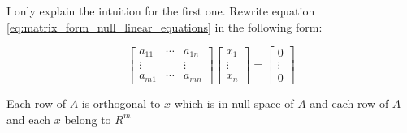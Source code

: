 \documentclass[a4paper]{book}
\newenvironment{proof}[1][Proof]{\begin{trivlist}
\item[\hskip \labelsep {\bfseries #1}]}{\end{trivlist}}
\begin{document}
    \begin{proof}
      I only explain the intuition for the first one. Rewrite equation
      \ref{eq:matrix_form_null_linear_equations} in the following form:

      \begin{displaymath}
        \begin{bmatrix}
          a_{11} & \cdots & a_{1n} \\
          \vdots &        & \vdots \\
          a_{m1} & \cdots & a_{mn} 
        \end{bmatrix}
        \begin{bmatrix}
          x_{1} \\
          \vdots \\
          x_{n} 
        \end{bmatrix}
        =
        \begin{bmatrix}
          0 \\
          \vdots \\
          0 
        \end{bmatrix}
      \end{displaymath}

      Each row of $A$ is orthogonal to $x$ which is in null space of $A$
      and each row of $A$ and each $x$ belong to $R^{m}$
    \end{proof}
\end{document}
